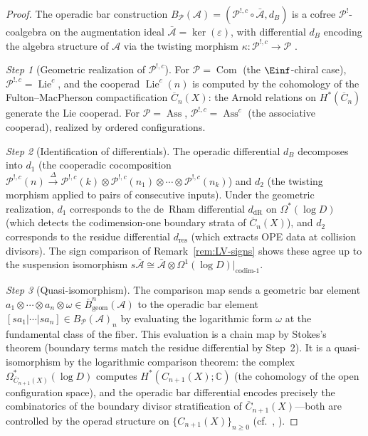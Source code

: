 \begin{proof}
The operadic bar construction
$B_{\mathcal{P}}(\mathcal{A}) =
(\mathcal{P}^{!,c} \circ \bar{\mathcal{A}}, d_B)$
is a cofree $\mathcal{P}^!$-coalgebra on the augmentation ideal
$\bar{\mathcal{A}} = \ker(\varepsilon)$, with differential $d_B$
encoding the algebra structure of $\mathcal{A}$ via the twisting
morphism $\kappa: \mathcal{P}^{!,c} \to \mathcal{P}$
\cite[Theorem~6.5.7]{LV12}.

\emph{Step 1} (Geometric realization of $\mathcal{P}^{!,c}$).
For $\mathcal{P} = \operatorname{Com}$ (the $\Einf$-chiral case),
$\mathcal{P}^{!,c} = \operatorname{Lie}^c$, and the cooperad
$\operatorname{Lie}^c(n)$ is computed by the cohomology of the
Fulton--MacPherson compactification $\overline{C}_n(X)$: the Arnold
relations on $H^*(\overline{C}_n)$ generate the Lie cooperad.
For $\mathcal{P} = \operatorname{Ass}$,
$\mathcal{P}^{!,c} = \operatorname{Ass}^c$ (the associative
cooperad), realized by ordered configurations.

\emph{Step 2} (Identification of differentials).
The operadic differential $d_B$ decomposes into $d_1$ (the cooperadic cocomposition $\mathcal{P}^{!,c}(n)
\xrightarrow{\Delta} \mathcal{P}^{!,c}(k)
\otimes \mathcal{P}^{!,c}(n_1) \otimes \cdots
\otimes \mathcal{P}^{!,c}(n_k)$) and $d_2$ (the twisting morphism applied to pairs of consecutive inputs).
Under the geometric realization, $d_1$ corresponds to the de~Rham
differential $d_{\mathrm{dR}}$ on $\Omega^*(\log D)$ (which detects
the codimension-one boundary strata of $\overline{C}_n(X)$), and
$d_2$ corresponds to the residue differential $d_{\mathrm{res}}$
(which extracts OPE data at collision divisors).  The sign
comparison of Remark~\ref{rem:LV-signs} shows these agree up to
the suspension isomorphism
$s\bar{\mathcal{A}} \cong \bar{\mathcal{A}} \otimes
\Omega^1(\log D)|_{\text{codim-1}}$.

\emph{Step 3} (Quasi-isomorphism).
The comparison map sends a geometric bar element
$a_1 \otimes \cdots \otimes a_n \otimes \omega
\in \bar{B}_{\mathrm{geom}}^n(\mathcal{A})$
to the operadic bar element
$[sa_1 | \cdots | sa_n] \in B_{\mathcal{P}}(\mathcal{A})_n$
by evaluating the logarithmic form $\omega$ at the fundamental class
of the fiber.  This evaluation is a chain map by Stokes's theorem
(boundary terms match the residue differential by Step~2).
It is a quasi-isomorphism by the logarithmic comparison theorem:
the complex $\Omega^*_{\overline{C}_{n+1}(X)}(\log D)$ computes
$H^*(C_{n+1}(X); \mathbb{C})$ (the cohomology of the open configuration
space), and the operadic bar differential encodes precisely the
combinatorics of the boundary divisor stratification of
$\overline{C}_{n+1}(X)$---both are controlled by the operad structure
on $\{C_{n+1}(X)\}_{n \geq 0}$
(cf.\ \cite[Theorem~3.7.4]{BD04}, \cite[Theorem~5.1]{Get95}).
\end{proof}

